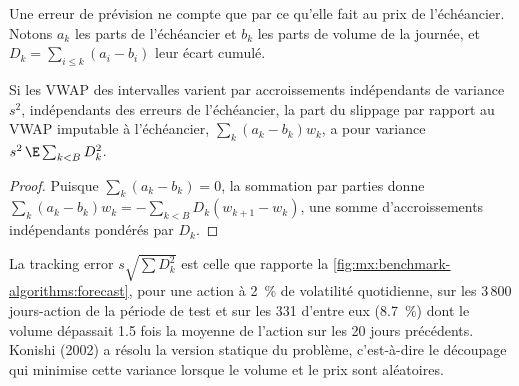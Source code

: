 \label{lst:mx:benchmark-algorithms:levelar}

Une erreur de prévision ne compte que par ce qu'elle fait au prix de l'échéancier. Notons $a_k$ les parts de l'échéancier et $b_k$ les parts de volume de la journée, et
$D_k=\sum_{i\le k}(a_i-b_i)$ leur écart cumulé.

\begin{proposition}\label{prop:mx:benchmark-algorithms:tracking}
Si les VWAP des intervalles varient par accroissements indépendants de variance $s^2$, indépendants des erreurs de l'échéancier, la part du slippage par rapport au VWAP
imputable à l'échéancier, $\sum_k(a_k-b_k)w_k$, a pour variance $s^2\,\E\sum_{k<B}D_k^2$.
\end{proposition}

\begin{proof}
Puisque $\sum_k(a_k-b_k)=0$, la sommation par parties donne $\sum_k(a_k-b_k)w_k=-\sum_{k<B}D_k(w_{k+1}-w_k)$, une somme d'accroissements indépendants pondérés par
$D_k$.
\end{proof}

La tracking error $s\sqrt{\sum D_k^2}$ est celle que rapporte la \cref{fig:mx:benchmark-algorithms:forecast}, pour une action à 2~\% de volatilité quotidienne, sur les 3\,800
jours-action de la période de test et sur les 331 d'entre eux (8.7~\%) dont le volume dépassait 1.5 fois la moyenne de l'action sur les 20 jours précédents. Konishi
(2002) a résolu la version statique du problème, c'est-à-dire le découpage qui minimise cette variance lorsque le volume et le prix sont aléatoires.

